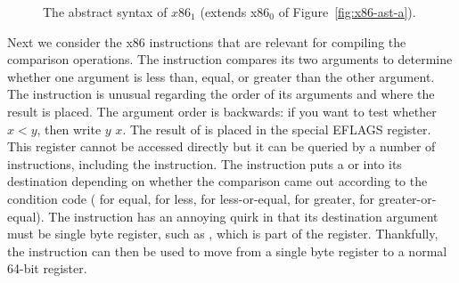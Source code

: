 \documentclass[11pt]{book}
\newcommand{\gray}[1]{{\color{lightgray} #1}}
\begin{document}
\begin{figure}[tp]
\fbox{
\begin{minipage}{0.96\textwidth}
\small    
\[
\begin{array}{lcl}
\Arg &::=&  \gray{\IMM{\Int} \mid \REG{\code{'}\Reg} \mid \DEREF{\Reg}{\Int}} 
     \mid \BYTEREG{\code{'}\Reg} \\
\itm{cc} & ::= & \key{e} \mid \key{l} \mid \key{le} \mid \key{g} \mid \key{ge} \\
\Instr &::=& \gray{\BININSTR{\code{'addq}}{\Arg}{\Arg}} 
       \mid \gray{\BININSTR{\code{'subq}}{\Arg}{\Arg}} \\
       &\mid& \gray{\BININSTR{\code{'movq}}{\Arg}{\Arg}} 
       \mid \gray{\UNIINSTR{\code{'negq}}{\Arg}} \\
       &\mid& \gray{\CALLQ{\itm{label}} \mid \RETQ{}} 
       \mid \gray{\PUSHQ{\Arg} \mid \POPQ{\Arg}} \\
       &\mid& \BININSTR{\code{'xorq}}{\Arg}{\Arg}
       \mid \BININSTR{\code{'cmpq}}{\Arg}{\Arg}\\
       &\mid& \BININSTR{\code{'set}}{\code{'}\itm{cc}}{\Arg} 
       \mid \BININSTR{\code{'movzbq}}{\Arg}{\Arg}\\
       &\mid&  \JMP{\itm{label}}
       \mid \JMPIF{\code{'}\itm{cc}}{\itm{label}} \\
\Block &::= & \gray{\BLOCK{\itm{info}}{\Instr^{+}}} \\
x86_1 &::= & \gray{\PROGRAM{\itm{info}}{\CFG{\key{(}\itm{label} \,\key{.}\, \Block \key{)}^{+}}}}
\end{array}
\]
\end{minipage}
}
\caption{The abstract syntax of $x86_1$ (extends x86$_0$ of Figure~\ref{fig:x86-ast-a}).}
\label{fig:x86-1}
\end{figure}

Next we consider the x86 instructions that are relevant for compiling
the comparison operations. The  instruction compares its two
arguments to determine whether one argument is less than, equal, or
greater than the other argument. The  instruction is unusual
regarding the order of its arguments and where the result is
placed. The argument order is backwards: if you want to test whether
$x < y$, then write  $y$\code{,} $x$. The result of
 is placed in the special EFLAGS register. This register
cannot be accessed directly but it can be queried by a number of
instructions, including the  instruction. The 
instruction puts a  or  into its destination depending
on whether the comparison came out according to the condition code
 ( for equal,  for less,  for
less-or-equal,  for greater,  for greater-or-equal).
The  instruction has an annoying quirk in that its
destination argument must be single byte register, such as ,
which is part of the  register.  Thankfully, the
 instruction can then be used to move from a single byte
register to a normal 64-bit register.
\end{document}
